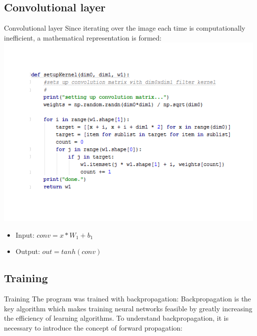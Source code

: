 \documentclass[12pt]{beamer}
\begin{document}
\subsection{Convolutional layer}

\begin{frame}{Convolutional layer}
Since iterating over the image each time is computationally inefficient, a mathematical representation is formed:\newline
\centering\includegraphics[width = 0.6\linewidth]{images/codekernel.png}
\begin{itemize}
\item Input: \space$conv = x*W_1 + b_1$ 
\item Output: $out = tanh(conv)$ 
\end{itemize}
\end{frame}



\subsection{Training}
\begin{frame}{Training}
\large
The program was trained with backpropagation: \newline \newline
Backpropagation is the key algorithm which makes training neural networks feasible by greatly increasing the efficiency of learning algorithms.
\newline
To understand backpropagation, it is necessary to introduce the concept of forward propagation:

\end{frame}
\end{document}
